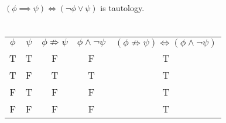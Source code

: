\documentclass{article}
\begin{document}
$(\phi \implies \psi) \Leftrightarrow (\neg \phi \vee \psi)$ is tautology. \\

\section{}
\begin{tabular}{ c c c c c }
  $\phi$ & $\psi$ & $\phi \not\Rightarrow \psi$ & $\phi \wedge \neg\psi$ & $(\phi \not\Rightarrow \psi) \Leftrightarrow (\phi \wedge \neg\psi)$ \\
  T      & T      & F                    & F                    & T                                                  \\
  T      & F      & T                    & T                    & T                                                 \\
  F      & T      & F                    & F                    & T                                                 \\
  F      & F      & F                    & F                    & T                                                  \\
\end{tabular} \\
\end{document}
